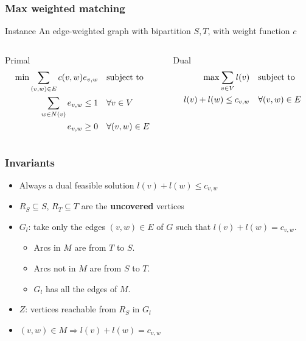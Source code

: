 \begin{frame}[fragile]
\frametitle{Max weighted matching}

\begin{block}{Instance}
An edge-weighted graph \g with bipartition \(S,T\), with weight function \(c\)
\end{block}

\begin{columns}
\begin{column}{0.45\textwidth}
\begin{block}{Primal}
\begin{align}
  \min \sum_{(v,w)\in E} c(v,w)e_{v,w}                  \quad&\text{subject to }\notag\\
  \sum_{w\in N(v)} e_{v,w} \le 1 \quad& \forall v\in V           \notag\\
  e_{v,w}\ge 0         \quad& \forall (v,w)\in E \notag
\end{align}
\end{block}
\end{column}
\begin{column}{0.45\textwidth}
\begin{block}{Dual}
\begin{align}
  \max \sum_{v\in V} l(v)   \quad&\text{subject to }\notag\\
  l(v) + l(w) \le c_{v,w}  \quad&\forall (v,w)\in E \notag
\end{align}
\end{block}
\end{column}
\end{columns}
\end{frame}

\begin{frame}[fragile]
\frametitle{Invariants}

\begin{itemize}
\item
      Always a dual feasible solution $l(v) + l(w) \le c_{v,w}$
\item
      $R_{S}\subseteq S$, $R_{T}\subseteq T$ are the \textbf{uncovered} vertices
\item
      $G_{l}$: take only the edges $(v,w)\in E$ of $G$ such that
      $l(v) + l(w) = c_{v,w}$.
      \begin{itemize}
      \item Arcs in $M$ are from $T$ to $S$.
      \item  Arcs not in $M$ are from $S$ to $T$.
      \item $G_{l}$ has all the edges of $M$.
      \end{itemize}
\item
      $Z$: vertices reachable from $R_{S}$ in $G_{l}$
\item $(v,w)\in M \Rightarrow l(v) + l(w) = c_{v,w}$
\end{itemize}
\end{frame}

